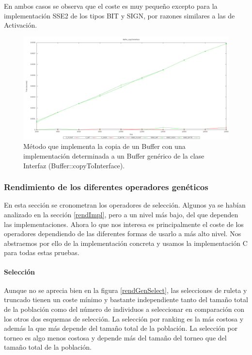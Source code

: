 \documentclass[11pt]{article}
\begin{document}
\begin{titlepage}
En ambos casos se observa que el coste es muy pequeño excepto para la implementación SSE2 de los tipos BIT y SIGN, por razones similares a las de Activación.

\begin{figure}[htb]
\centering
\includegraphics[width=\textwidth]{./img/Buffer_copyToInterface.png}
\caption{\label{grafImplCopyTo}Método que implementa la copia de un Buffer con una implementación determinada a un Buffer genérico de la clase Interfaz (Buffer::copyToInterface).}
\end{figure}
\newpage
\newpage
\subsubsection{Rendimiento de los diferentes operadores genéticos}
\label{sec-6-1-2}

   \label{rendOperadores}

En esta sección se cronometran los operadores de selección. Algunos ya se habían analizado en la sección \ref{rendImpl}, pero a un nivel más bajo, del que dependen las implementaciones. Ahora lo que nos interesa es principalmente el coste de los operadores dependiendo de las diferentes formas de usarlo a más alto nivel. Nos abstraemos por ello de la implementación concreta y usamos la implementación C para todas estas pruebas.
\paragraph{Selección}
\label{sec-6-1-2-1}


Aunque no se aprecia bien en la figura \ref{rendGenSelect}, las selecciones de ruleta y truncado tienen un coste mínimo y bastante independiente tanto del tamaño total de la población como del número de individuos a seleccionar en comparación con los otros dos esquemas de selección. La selección por ranking es la más costosa y además la que más depende del tamaño total de la población. La selección por torneo es algo menos costosa y depende más del tamaño del torneo que del tamaño total de la población.


\end{titlepage}
\end{document}
